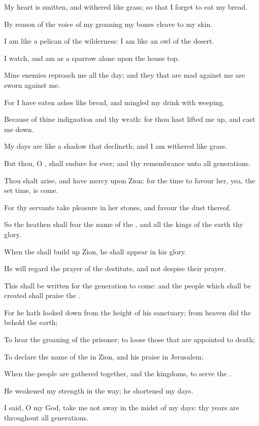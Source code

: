 \Verse My heart is smitten, and withered like grass; so that I forget to eat my bread.

\Verse By reason of the voice of my groaning my bones cleave to my skin.

\Verse I am like a pelican of the wilderness: I am like an owl of the desert.

\Verse I watch, and am as a sparrow alone upon the house top.

\Verse Mine enemies reproach me all the day; and they that are mad against me are sworn against me.

\Verse For I have eaten ashes like bread, and mingled my drink with weeping.

\Verse Because of thine indignation and thy wrath: for thou hast lifted me up, and cast me down.

\Verse My days are like a shadow that declineth; and I am withered like grass.

\Verse But thou, O \LORD, shall endure for ever; and thy remembrance unto all generations.

\Verse Thou shalt arise, and have mercy upon Zion: for the time to favour her, yea, the set time, is come.

\Verse For thy servants take pleasure in her stones, and favour the dust thereof.

\Verse So the heathen shall fear the name of the \LORD, and all the kings of the earth thy glory.

\Verse When the \LORD shall build up Zion, he shall appear in his glory.

\Verse He will regard the prayer of the destitute, and not despise their prayer.

\Verse This shall be written for the generation to come: and the people which shall be created shall praise the \LORD.

\Verse For he hath looked down from the height of his sanctuary; from heaven did the \LORD behold the earth;

\Verse To hear the groaning of the prisoner; to loose those that are appointed to death;

\Verse To declare the name of the \LORD in Zion, and his praise in Jerusalem;

\Verse When the people are gathered together, and the kingdoms, to serve the \LORD.

\Verse He weakened my strength in the way; he shortened my days.

\Verse I said, O my God, take me not away in the midst of my days: thy years are throughout all generations.

